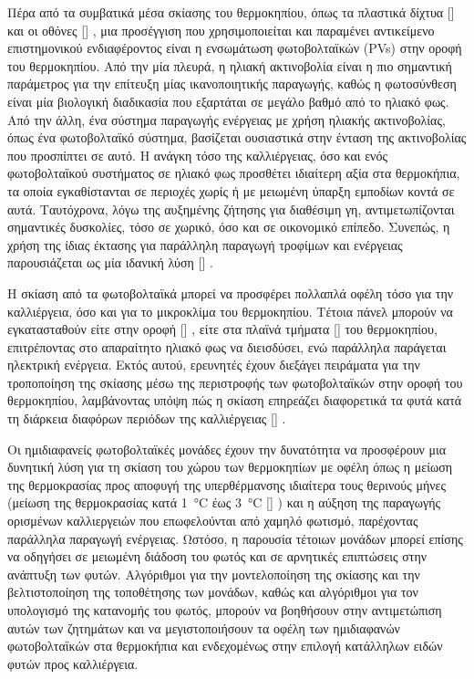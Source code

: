 \documentclass[12pt, a4paper]{report} %
\DeclareRobustCommand{\lcitep}[1]{%
  \english{[\cite{#1}]}%
}
\newcommand{\english}{\foreignlanguage{english}}
\begin{document}
Πέρα από τα συμβατικά μέσα σκίασης του θερμοκηπίου, όπως τα πλαστικά δίχτυα 
\lcitep{eisagwgi_str_bib37,eisagwgi_str_bib38,eisagwgi_str_bib39,eisagwgi_adv_alg_bib3} και οι οθόνες 
\lcitep{eisagwgi_str_bib41,eisagwgi_str_bib42}, μια προσέγγιση που χρησιμοποιείται και παραμένει αντικείμενο 
επιστημονικού ενδιαφέροντος είναι η ενσωμάτωση φωτοβολταϊκών (\english{PVs}) στην οροφή του θερμοκηπίου. Από την μία 
πλευρά, η ηλιακή ακτινοβολία είναι η πιο σημαντική παράμετρος για την επίτευξη μίας ικανοποιητικής παραγωγής, καθώς η 
φωτοσύνθεση είναι μία βιολογική διαδικασία που εξαρτάται σε μεγάλο βαθμό από το ηλιακό φως. Από την άλλη, ένα σύστημα 
παραγωγής ενέργειας με χρήση ηλιακής ακτινοβολίας, όπως ένα φωτοβολταϊκό σύστημα, βασίζεται ουσιαστικά στην ένταση της 
ακτινοβολίας που προσπίπτει σε αυτό. Η ανάγκη τόσο της καλλιέργειας, όσο και ενός φωτοβολταϊκού συστήματος σε ηλιακό 
φως προσθέτει ιδιαί\-τερη αξία στα θερμοκήπια, τα οποία εγκαθίστανται σε περιοχές χωρίς ή με μειωμένη ύπαρξη εμποδίων κοντά 
σε αυτά. Ταυτόχρονα, λόγω της αυξημένης ζήτησης για διαθέσιμη γη, αντιμετωπίζονται σημαντικές δυσκολίες, τόσο σε χωρικό, 
όσο και σε οικονομικό επίπεδο. Συνεπώς, η χρήση της ίδιας έκτασης για παράλληλη παραγωγή τροφίμων και ενέργειας 
παρουσιάζεται ως μία ιδανική λύση \lcitep{eisagwgi_alg_bib15,eisagwgi_alg_bib16,eisagwgi_str_bib34,eisagwgi_str_bib43}. 

Η σκίαση από τα φωτοβολταϊκά μπορεί να προσφέρει πολλαπλά οφέλη τόσο για την καλλιέργεια, όσο και για το μικροκλίμα του 
θερμοκηπίου. Τέτοια πάνελ μπορούν να εγκατασταθούν είτε στην οροφή \lcitep{eisagwgi_alg_bib21}, είτε στα πλαϊνά τμήματα 
\lcitep{eisagwgi_alg_bib22} του θερμοκηπίου, επιτρέποντας στο απαραίτητο ηλιακό φως να διεισδύσει, ενώ παράλληλα παράγεται 
ηλεκτρική ενέργεια. Εκτός αυτού, ερευνητές έχουν διεξάγει πειράματα για την τροποποίηση της σκίασης μέσω της περιστροφής 
των φωτοβολταϊκών στην οροφή του θερμοκηπίου, λαμβάνοντας υπόψη πώς η σκίαση επηρεάζει διαφορετικά τα φυτά κατά τη διάρκεια 
διαφόρων περιόδων της καλλιέργειας \lcitep{eisagwgi_alg_bib23}.

Οι ημιδιαφανείς φωτοβολταϊκές μονάδες έχουν την δυνατότητα να προσφέρουν μια δυνητική λύση για τη σκίαση του χώρου των 
θερμοκηπίων με οφέλη όπως η μείωση της θερμοκρασίας προς αποφυγή της υπερθέρμανσης ιδιαίτερα τους θερινούς μήνες (μείωση 
της θερμοκρασίας κατά \SI{1}{\degreeCelsius} έως \SI{3}{\degreeCelsius} \lcitep{eisagwgi_alg_bib33}) και η αύξηση της 
παραγωγής ορισμένων καλλιεργειών που επωφελούνται από χαμηλό φωτισμό, παρέχοντας παράλληλα παραγωγή ενέργειας. Ωστόσο, η 
παρουσία τέτοιων μονάδων μπορεί επίσης να οδηγήσει σε μειωμένη διάδοση του φωτός και σε αρνητικές επιπτώσεις στην ανάπτυξη 
των φυτών. Αλγόριθμοι για την μοντελοποίηση της σκίασης και την βελτιστοποίηση της τοποθέτησης των μονάδων, καθώς και 
αλγόριθμοι για τον υπολογισμό της κατανομής του φωτός, μπορούν να βοηθήσουν στην αντιμετώπιση αυτών των ζητημάτων και να 
μεγιστοποιήσουν τα οφέλη των ημιδιαφανών φωτοβολταϊκών στα θερμοκήπια και ενδεχομένως στην επιλογή κατάλληλων ειδών φυτών προς 
καλλιέργεια.
\end{document}
